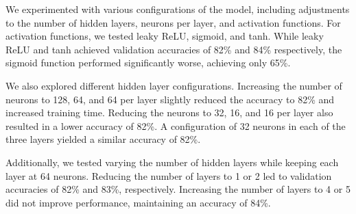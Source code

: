 We experimented with various configurations of the model, including adjustments to the number of hidden layers, neurons per layer, and activation functions. For activation functions, we tested leaky ReLU, sigmoid, and tanh. While leaky ReLU and tanh achieved validation accuracies of 82\% and 84\% respectively, the sigmoid function performed significantly worse, achieving only 65\%.

We also explored different hidden layer configurations. Increasing the number of neurons to 128, 64, and 64 per layer slightly reduced the accuracy to 82\% and increased training time. Reducing the neurons to 32, 16, and 16 per layer also resulted in a lower accuracy of 82\%. A configuration of 32 neurons in each of the three layers yielded a similar accuracy of 82\%.

Additionally, we tested varying the number of hidden layers while keeping each layer at 64 neurons. Reducing the number of layers to 1 or 2 led to validation accuracies of 82\% and 83\%, respectively. Increasing the number of layers to 4 or 5 did not improve performance, maintaining an accuracy of 84\%.

